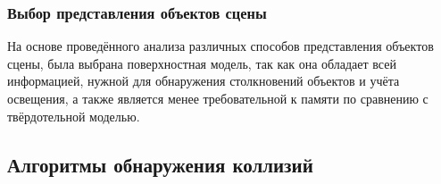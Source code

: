 \subsubsection*{Выбор представления объектов сцены}

На основе проведённого анализа различных способов представления объектов сцены, была выбрана поверхностная модель, так как она обладает всей информацией, нужной для обнаружения столкновений объектов и учёта освещения, а также является менее требовательной к памяти по сравнению с твёрдотельной моделью.







\subsection{Алгоритмы обнаружения коллизий}

